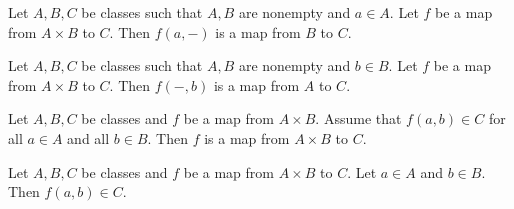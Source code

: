 \documentclass[../set-theory.tex]{subfiles}
\begin{document}
  \begin{forthel}
    \begin{proposition}\label{SET_THEORY_06_8946256734846976}
      Let $A, B, C$ be classes such that $A, B$ are nonempty and $a \in A$.
      Let $f$ be a map from $A \times B$ to $C$.
      Then $f(a,-)$ is a map from $B$ to $C$.
    \end{proposition}
  \end{forthel}

  \begin{forthel}
    \begin{proposition}\label{SET_THEORY_06_8080207992848384}
      Let $A, B, C$ be classes such that $A, B$ are nonempty and $b \in B$.
      Let $f$ be a map from $A \times B$ to $C$.
      Then $f(-,b)$ is a map from $A$ to $C$.
    \end{proposition}
  \end{forthel}

  \begin{forthel}
    \begin{proposition}\label{SET_THEORY_06_2754759509409792}
      Let $A, B, C$ be classes and $f$ be a map from $A \times B$.
      Assume that $f(a,b) \in C$ for all $a \in A$ and all $b \in B$.
      Then $f$ is a map from $A \times B$ to $C$.
    \end{proposition}
  \end{forthel}

  \begin{forthel}
    \begin{proposition}\label{SET_THEORY_06_2304295212941312}
      Let $A, B, C$ be classes and $f$ be a map from $A \times B$ to $C$.
      Let $a \in A$ and $b \in B$.
      Then $f(a,b) \in C$.
    \end{proposition}
  \end{forthel}
\end{document}
